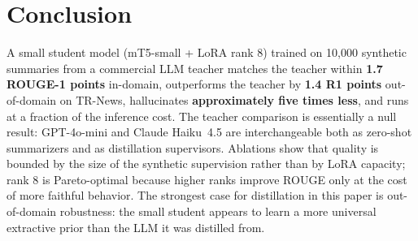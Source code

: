 \documentclass{llncs}
\begin{document}
\section{Conclusion}

A small student model (mT5-small + LoRA rank 8) trained on 10{,}000 synthetic summaries from a commercial LLM teacher matches the teacher within \textbf{1.7 ROUGE-1 points} in-domain, outperforms the teacher by \textbf{1.4 R1 points} out-of-domain on TR-News, hallucinates \textbf{approximately five times less}, and runs at a fraction of the inference cost. The teacher comparison is essentially a null result: GPT-4o-mini and Claude Haiku~4.5 are interchangeable both as zero-shot summarizers and as distillation supervisors. Ablations show that quality is bounded by the size of the synthetic supervision rather than by LoRA capacity; rank 8 is Pareto-optimal because higher ranks improve ROUGE only at the cost of more faithful behavior. The strongest case for distillation in this paper is out-of-domain robustness: the small student appears to learn a more universal extractive prior than the LLM it was distilled from.
\end{document}
